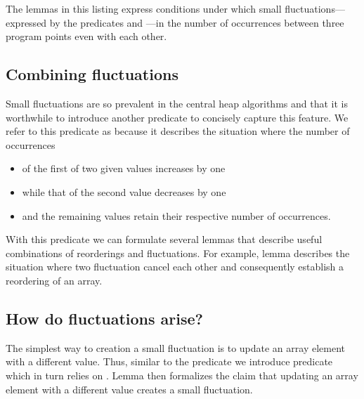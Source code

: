 The lemmas in this listing express conditions under which small
fluctuations---expressed by the predicates 
and ---in the number of occurrences between three
program points even with each other.




\subsection{Combining fluctuations}

Small fluctuations are so prevalent in the central heap algorithms 
and  that it is worthwhile to introduce another predicate
to concisely capture this feature.
We refer to this predicate as  because it describes
the situation where the number of occurrences 

\begin{itemize}
\item of the first of two given values increases by one
\item while that of the second value decreases by one
\item and the remaining values retain their respective number of occurrences.
\end{itemize}

With this predicate we can formulate several lemmas that describe useful
combinations of reorderings and fluctuations.
For example, lemma  describes
the situation where two fluctuation cancel each other and consequently
establish a reordering of an array.



\subsection{How do fluctuations arise?}

The simplest way to creation a small fluctuation is to
update an array element with a different value.
Thus, similar to the predicate  we introduce 
predicate  which in turn relies on .
Lemma  then formalizes the claim
that updating an array element with a different value creates a small fluctuation.



\clearpage

